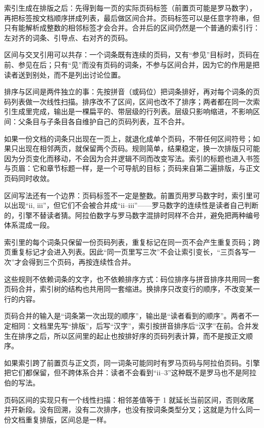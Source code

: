 \documentclass{article}
\begin{document}
索引生成在排版之后：先得到每一页的实际页码标签（前置页可能是罗马数字），再把标签按文档顺序拼成列表，最后做区间合并。页码标签可以是任意字符串，但只有能解析成整数的相邻标签才会合并。合并后的区间仍然是一个普通的索引行：左对齐的词条、引导点、右对齐的页码。

区间与交叉引用可以共存：一个词条既有连续的页码，又有“参见”目标时，页码在前、参见在后；只有“见”而没有页码的词条，不参与区间合并，因为它的作用是把读者送到别处，而不是列出讨论位置。

排序与区间是两件独立的事：先按拼音（或码位）把词条排好，再对每个词条的页码列表做一次线性扫描。排序改不了区间，区间也改不了排序；两者都在同一次索引生成里完成，输出是一棵扁平的、带层级的行列表。层级只影响缩进，不影响区间：父条目与子条目各自维护自己的页码列表，互不合并。

如果一份文档的词条只出现在一页上，就退化成单个页码，不带任何区间符号；如果只出现在相邻两页，就保留两个页码。规则简单，结果稳定，换一次排版只可能因为分页变化而移动，不会因为合并逻辑不同而改变写法。索引的标题也进入书签与页眉：它和章节标题一样，是一个可导航的目标；页码来自第二遍排版，与正文页码同时收敛。

区间写法还有一个边界：页码标签不一定是整数。前置页用罗马数字时，索引里可以出现“ii, iii”，但它们不会被合并成“ii–iii”——罗马数字的连续性是读者自己判断的，引擎不替读者猜。阿拉伯数字与罗马数字混排时同样不合并，避免把两种编号体系混成一段。

索引里的每个词条只保留一份页码列表，重复标记在同一页不会产生重复页码；跨页重复标记才会进入列表。因此“同一页里写三次”不会让索引变长，“三页各写一次”才会得到三个页码，再按连续性合并。

这些规则不依赖词条的文字，也不依赖排序方式：码位排序与拼音排序共用同一套页码合并，索引树的结构也共用同一套缩进。换排序只改变行的顺序，不改变某一行的内容。

页码合并的输入是“词条第一次出现的顺序”，输出是“读者看到的顺序”。两者不一定相同：文档里先写“排版”，后写“汉字”，索引按拼音排序后“汉字”在前。合并发生在排序之后，所以区间里的起止也按排好序的页码列表计算，而不是按正文顺序。

如果索引跨了前置页与正文页，同一词条可能同时有罗马页码与阿拉伯页码。引擎把它们都保留，但不跨体系合并：读者不会看到“ii–3”这种既不是罗马也不是阿拉伯的写法。

页码区间的实现只有一个线性扫描：相邻差值等于 1 就延长当前区间，否则收尾并开新段。没有回溯，没有二次排序，也没有按词条类型分叉；这就是为什么同一份文档重复排版，区间总是一样。
\end{document}
